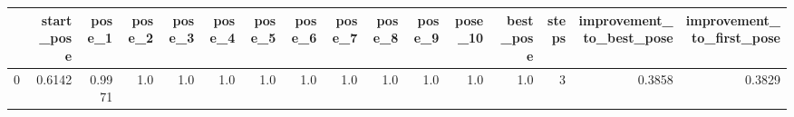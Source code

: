 \begin{tabular}{lrrrrrrrrrrrrrrr}
\toprule
{} &  start\_pose &  pose\_1 &  pose\_2 &  pose\_3 &  pose\_4 &  pose\_5 &  pose\_6 &  pose\_7 &  pose\_8 &  pose\_9 &  pose\_10 &  best\_pose &  steps &  improvement\_to\_best\_pose &  improvement\_to\_first\_pose \\
\midrule
0 &      0.6142 &  0.9971 &     1.0 &     1.0 &     1.0 &     1.0 &     1.0 &     1.0 &     1.0 &     1.0 &      1.0 &        1.0 &      3 &                    0.3858 &                     0.3829 \\
\bottomrule
\end{tabular}
